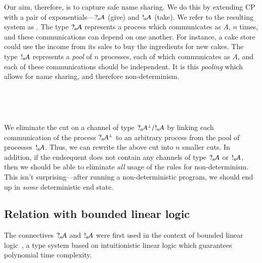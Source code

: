 \documentclass[twocolumn]{article}
\begin{document}
Our aim, therefore, is to capture safe name sharing.
We do this by extending CP with a pair of exponentials---$\give[n]{A}$ (give)
and $\take[n]{A}$ (take).
We refer to the resulting system as \gtcp.
The type $\give[n]{A}$ represents a process which communicates as $A$, $n$
times, and these communications can depend on one another.
For instance, a cake store could use the income from its sales to buy the
ingredients for new cakes.
The type $\take[n]{A}$ represents a \emph{pool} of $n$ processes, each of which
communicates as $A$, and each of these communications should be independent.
It is this \emph{pooling} which allows for name sharing, and therefore
non-determinism.
\begin{center}
  \begin{proofbox}
    \SYM{\give{}}
  \end{proofbox}
  \begin{proofbox}
    \SYM{\take{}}
  \end{proofbox}
  \\[1\baselineskip]
  \begin{proofbox}
  \end{proofbox}
  \\[1\baselineskip]
  \begin{proofbox}
  \end{proofbox}
\end{center}
We eliminate the cut on a channel of type $\give[n]{A^\bot} / \take[n]{A}$
by linking each communication of the process $\give[n]{A^\bot}$ to an arbitrary
process from the pool of processes $\take[n]{A}$. 
Thus, we can rewrite the above cut into $n$ smaller cuts.
In addition, if the endsequent does not contain any channels of type
$\give[n]{A}$ or $\take[n]{A}$, then we should be able to eliminate \emph{all}
usage of the rules for non-determinism. This isn't surprising---after running a
non-deterministic program, we should end up in \emph{some} deterministic end
state. 

\subsection{Relation with bounded linear logic}
The connectives $\give[n]{A}$ and $\take[n]{A}$ were first used in the context
of bounded linear logic~\citep[BLL;][]{girard1992}, a type system based on
intuitionistic linear logic which guarantees polynomial time complexity.
\end{document}
